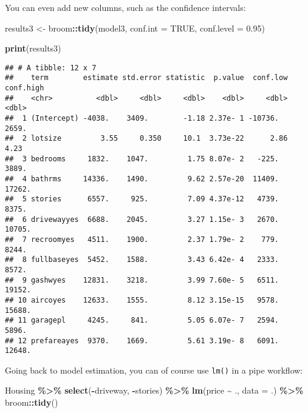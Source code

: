 \documentclass[
]{article}
\newenvironment{Shaded}{\begin{snugshade}}{\end{snugshade}}
\newcommand{\DataTypeTok}[1]{\textcolor[rgb]{0.13,0.29,0.53}{#1}}
\newcommand{\FloatTok}[1]{\textcolor[rgb]{0.00,0.00,0.81}{#1}}
\newcommand{\KeywordTok}[1]{\textcolor[rgb]{0.13,0.29,0.53}{\textbf{#1}}}
\newcommand{\NormalTok}[1]{#1}
\newcommand{\OperatorTok}[1]{\textcolor[rgb]{0.81,0.36,0.00}{\textbf{#1}}}
\newcommand{\OtherTok}[1]{\textcolor[rgb]{0.56,0.35,0.01}{#1}}
\newcommand{\StringTok}[1]{\textcolor[rgb]{0.31,0.60,0.02}{#1}}
\begin{document}
You can even add new columns, such as the confidence intervals:

\begin{Shaded}
\begin{Highlighting}[]
\NormalTok{results3 \textless{}{-}}\StringTok{ }\NormalTok{broom}\OperatorTok{::}\KeywordTok{tidy}\NormalTok{(model3, }\DataTypeTok{conf.int =} \OtherTok{TRUE}\NormalTok{, }\DataTypeTok{conf.level =} \FloatTok{0.95}\NormalTok{)}

\KeywordTok{print}\NormalTok{(results3)}
\end{Highlighting}
\end{Shaded}

\begin{verbatim}
## # A tibble: 12 x 7
##    term        estimate std.error statistic  p.value  conf.low conf.high
##    <chr>          <dbl>     <dbl>     <dbl>    <dbl>     <dbl>     <dbl>
##  1 (Intercept) -4038.    3409.        -1.18 2.37e- 1 -10736.     2659.  
##  2 lotsize         3.55     0.350     10.1  3.73e-22      2.86      4.23
##  3 bedrooms     1832.    1047.         1.75 8.07e- 2   -225.     3889.  
##  4 bathrms     14336.    1490.         9.62 2.57e-20  11409.    17262.  
##  5 stories      6557.     925.         7.09 4.37e-12   4739.     8375.  
##  6 drivewayyes  6688.    2045.         3.27 1.15e- 3   2670.    10705.  
##  7 recroomyes   4511.    1900.         2.37 1.79e- 2    779.     8244.  
##  8 fullbaseyes  5452.    1588.         3.43 6.42e- 4   2333.     8572.  
##  9 gashwyes    12831.    3218.         3.99 7.60e- 5   6511.    19152.  
## 10 aircoyes    12633.    1555.         8.12 3.15e-15   9578.    15688.  
## 11 garagepl     4245.     841.         5.05 6.07e- 7   2594.     5896.  
## 12 prefareayes  9370.    1669.         5.61 3.19e- 8   6091.    12648.
\end{verbatim}

Going back to model estimation, you can of course use \texttt{lm()} in a pipe workflow:

\begin{Shaded}
\begin{Highlighting}[]
\NormalTok{Housing }\OperatorTok{\%\textgreater{}\%}
\StringTok{  }\KeywordTok{select}\NormalTok{(}\OperatorTok{{-}}\NormalTok{driveway, }\OperatorTok{{-}}\NormalTok{stories) }\OperatorTok{\%\textgreater{}\%}
\StringTok{  }\KeywordTok{lm}\NormalTok{(price }\OperatorTok{\textasciitilde{}}\StringTok{ }\NormalTok{., }\DataTypeTok{data =}\NormalTok{ .) }\OperatorTok{\%\textgreater{}\%}
\StringTok{  }\NormalTok{broom}\OperatorTok{::}\KeywordTok{tidy}\NormalTok{()}
\end{Highlighting}
\end{Shaded}
\end{document}
